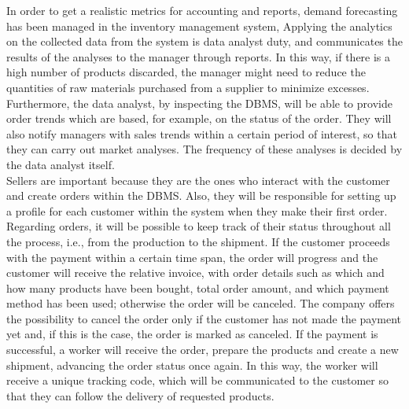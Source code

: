 In order to get a realistic metrics for accounting and reports, demand forecasting has been managed in the inventory management system, Applying the analytics on the collected data from the system is data analyst duty, and communicates the results of the analyses to the manager through reports. In this way, if there is a high number of products discarded, the manager might need to reduce the quantities of raw materials purchased from a supplier to minimize excesses. Furthermore, the data analyst, by inspecting the DBMS, will be able to provide order trends which are based, for example, on the status of the order. They will also notify managers with sales trends within a certain period of interest, so that they can carry out market analyses. The frequency of these analyses is decided by the data analyst itself.\\

Sellers are important because they are the ones who interact with the customer and create orders within the DBMS. Also, they will be responsible for setting up a profile for each customer within the system when they make their first order. Regarding orders, it will be possible to keep track of their status throughout all the process, i.e., from the production to the shipment. If the customer proceeds with the payment within a certain time span, the order will progress and the customer will receive the relative invoice, with order details such as which and how many products have been bought, total order amount, and which payment method has been used; otherwise the order will be canceled. The company offers the possibility to cancel the order only if the customer has not made the payment yet and, if this is the case, the order is marked as canceled. If the payment is successful, a worker will receive the order, prepare the products and create a new shipment, advancing the order status once again. In this way, the worker will receive a unique tracking code, which will be communicated to the customer so that they can follow the delivery of requested products. \\

